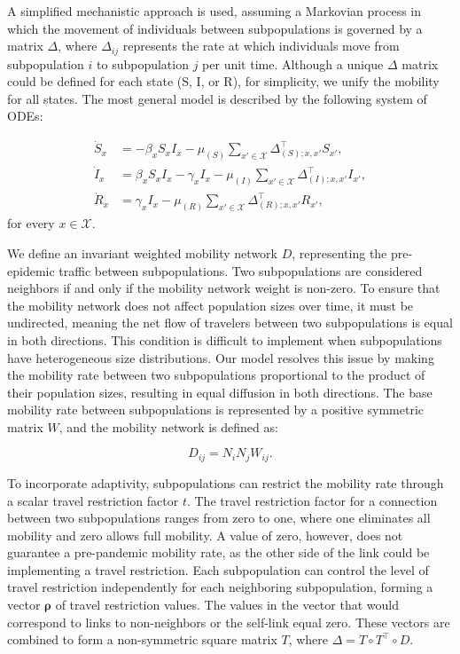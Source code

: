 A simplified mechanistic approach is used, assuming a Markovian process in which the movement of individuals between subpopulations is governed by a matrix \( \Delta \), where \( \Delta_{ij} \) represents the rate at which individuals move from subpopulation \( i \) to subpopulation \( j \) per unit time. Although a unique \( \Delta \) matrix could be defined for each state (S, I, or R), for simplicity, we unify the mobility for all states. The most general model is described by the following system of ODEs:

\begin{equation}
\begin{aligned}
    \dot{S}_{x} &= -\beta_{x} S_{x} I_{x} - \mu_{(S)} \sum_{x' \in \mathcal{X}} \Delta_{(S);x,x'}^{\top} S_{x'}, \\
    \dot{I}_{x} &= \beta_{x} S_{x} I_{x} - \gamma_{x} I_{x} - \mu_{(I)} \sum_{x' \in \mathcal{X}} \Delta_{(I);x,x'}^{\top} I_{x'}, \\
    \dot{R}_{x} &= \gamma_{x} I_{x} - \mu_{(R)} \sum_{x' \in \mathcal{X}} \Delta_{(R);x,x'}^{\top} R_{x'},
\end{aligned}
\end{equation}
for every \( x \in \mathcal{X} \).

We define an invariant weighted mobility network \( D \), representing the pre-epidemic traffic between subpopulations. Two subpopulations are considered neighbors if and only if the mobility network weight is non-zero. To ensure that the mobility network does not affect population sizes over time, it must be undirected, meaning the net flow of travelers between two subpopulations is equal in both directions. This condition is difficult to implement when subpopulations have heterogeneous size distributions. Our model resolves this issue by making the mobility rate between two subpopulations proportional to the product of their population sizes, resulting in equal diffusion in both directions. The base mobility rate between subpopulations is represented by a positive symmetric matrix \( W \), and the mobility network is defined as:

\begin{equation}
D_{ij} = N_i N_j W_{ij}.
\end{equation}

To incorporate adaptivity, subpopulations can restrict the mobility rate through a scalar travel restriction factor \(t\). The travel restriction factor for a connection between two subpopulations ranges from zero to one, where one eliminates all mobility and zero allows full mobility. A value of zero, however, does not guarantee a pre-pandemic mobility rate, as the other side of the link could be implementing a travel restriction. Each subpopulation can control the level of travel restriction independently for each neighboring subpopulation, forming a vector $\mathbf{\rho}$ of travel restriction values. The values in the vector that would correspond to links to non-neighbors or the self-link equal zero. These vectors are combined to form a non-symmetric square matrix \( T \), where \( \Delta = T \circ T^\top \circ D \).\\

